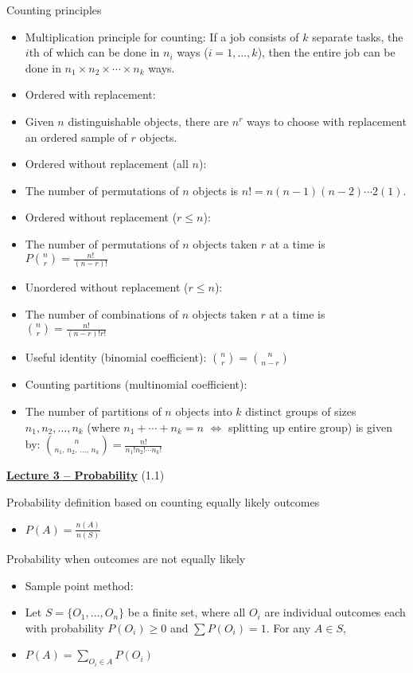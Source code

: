 \documentclass{article}
\newcommand{\bu}[1]{\textbf{\ul{#1}}}				%
\newcommand{\vecn}[2]{#1_1, \ldots, #1_{#2}}		%
\begin{document}
Counting principles
\begin{itemize}
    \item Multiplication principle for counting: If a job consists of $k$ separate tasks, the $i$th of which can be done in $n_i$ ways ($i = 1, \ldots, k$), then the entire job can be done in $n_1 \times n_2 \times \cdots \times n_k$ ways.
    \item Ordered with replacement:
    \item[] Given $n$ distinguishable objects, there are $n^r$ ways to choose with replacement an ordered sample of $r$ objects.
    \item Ordered without replacement (all $n$):
    \item[] The number of permutations of $n$ objects is $n! = n(n - 1)(n - 2) \cdots 2 (1)$.
    \item Ordered without replacement ($r \le n$):
    \item[] The number of permutations of $n$ objects taken $r$ at a time is $P{n \choose r} = \frac{n!}{(n - r)!}$
    \item Unordered without replacement ($r \le n$):
    \item[] The number of combinations of $n$ objects taken $r$ at a time is ${n \choose r} = \frac{n!}{(n - r)! r!}$
    \item Useful identity (binomial coefficient): ${n \choose r} = {n \choose {n - r}}$
    \item Counting partitions (multinomial coefficient):
    \item[] The number of partitions of $n$ objects into $k$ distinct groups of sizes $n_1, n_2, \ldots, n_k$ (where $n_1 + \cdots + n_k = n$ $\Longleftrightarrow$ splitting up entire group) is given by: ${n \choose {n_1,\, n_2,\, \ldots,\, n_k}} = \frac{n!}{n_1! n_2! \cdots n_k!}$
\end{itemize}

\vspace{80pt}

{\large \bu{Lecture 3 -- Probability}} (1.1)\bigskip

Probability definition based on counting equally likely outcomes
\begin{itemize}
    \item $\displaystyle P(A) = \frac{n(A)}{n(S)}$
\end{itemize}\bigskip

Probability when outcomes are not equally likely
\begin{itemize}
    \item Sample point method:
    \item[] Let $S = \{\vecn{O}{n}\}$ be a finite set, where all $O_i$ are individual outcomes each with probability $P(O_i) \ge 0$ and $\sum P(O_i) = 1$. For any $A \in S$,
    \item $\displaystyle P(A) = \sum_{O_i \in A} P(O_i)$
\end{itemize}\bigskip
\end{document}
